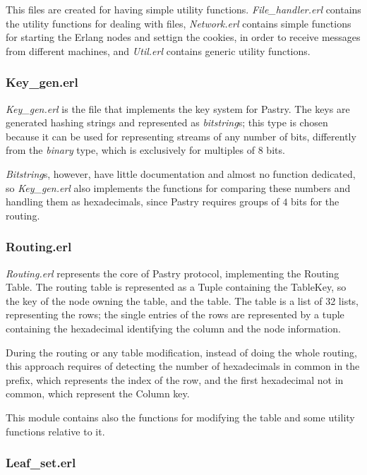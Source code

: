\documentclass{article}
\begin{document}
This files are created for having simple utility functions. \textit{File\_handler.erl} contains the utility functions
for dealing with files, \textit{Network.erl} contains simple functions for starting the Erlang nodes and settign the cookies, in
order to receive messages from different machines, and \textit{Util.erl} contains generic utility functions.

\subsubsection{Key\_gen.erl}

\textit{Key\_gen.erl} is the file that implements the key system for Pastry. The keys are generated hashing strings
and represented as \textit{bitstring}s; this type is chosen because it can be used for
representing streams of any number of bits, differently from the \textit{binary} type, which is exclusively for 
multiples of $8$ bits.

\textit{Bitstring}s, however, have little documentation and almost no function dedicated, so \textit{Key\_gen.erl}
also implements the functions for comparing these numbers and handling them as hexadecimals, since Pastry 
requires groups of $4$ bits for the routing.


\subsubsection{Routing.erl}

\textit{Routing.erl} represents the core of Pastry protocol, implementing the Routing Table.
The routing table is represented as a Tuple containing the TableKey, so the key of the node owning the table,
and the table. The table is a list of 32 lists, representing the rows; the single entries of the rows are 
represented by a tuple containing the hexadecimal identifying the column and the node information.

During the routing or any table modification, instead of doing the whole routing, this approach requires
of detecting the number of hexadecimals in common in the prefix, which represents the index of the row, and the 
first hexadecimal not in common, which represent the Column key.

This module contains also the functions for modifying the table and some utility functions relative to it.

\subsubsection{Leaf\_set.erl}
\end{document}
